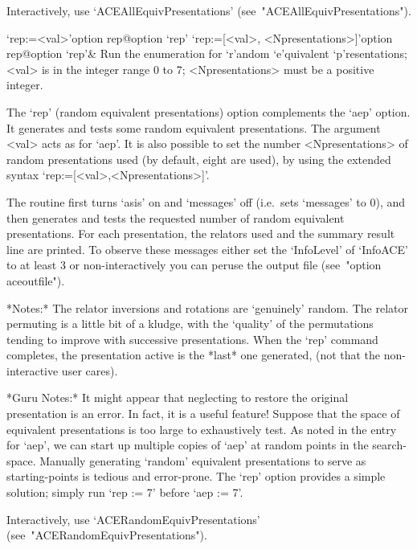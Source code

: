 Interactively,             use              `ACEAllEquivPresentations'
(see~"ACEAllEquivPresentations").

\>`rep:=<val>'{option rep}@{option `rep'}
\>`rep:=[<val>, <Npresentations>]'{option rep}@{option `rep'}&
Run the enumeration for `r'andom `e'quivalent `p'resentations;
<val> is in the integer range 0 to 7;
<Npresentations> must be a positive integer.

The `rep' (random equivalent  presentations)  option  complements  the
`aep'  option.  It  generates  and  tests   some   random   equivalent
presentations. The argument <val>  acts  as  for  `aep'.  It  is  also
possible to set the number <Npresentations>  of  random  presentations
used (by default, eight  are  used),  by  using  the  extended  syntax
`rep:=[<val>,<Npresentations>]'.

The routine first  turns  `asis'  on  and  `messages'  off  (i.e.~sets
`messages' to 0), and then generates and tests the requested number of
random equivalent presentations. For each presentation,  the  relators
used and the  summary  result  line  are  printed.  To  observe  these
messages either set the `InfoLevel' of `InfoACE'  to  at  least  3  or
non-interactively you can peruse the {\ACE} output  file  (see~"option
aceoutfile").

*Notes:*
The relator inversions and rotations are \lq{}genuinely'  random.  The
relator permuting is a little bit of a kludge, with the  \lq{}quality'
of the permutations tending to improve with successive  presentations.
When the `rep' command  completes,  the  presentation  active  is  the
*last* one generated, (not that the non-interactive user cares).

*Guru Notes:*
It might appear that neglecting to restore the  original  presentation
is an error. In fact, it is a useful feature! Suppose that  the  space
of equivalent presentations is too  large  to  exhaustively  test.  As
noted in the entry for `aep', we can start up multiple copies of `aep'
at random points in the  search-space.  Manually  generating  `random'
equivalent presentations to serve as starting-points  is  tedious  and
error-prone. The `rep' option provides a simple solution;  simply  run
`rep := 7' before `aep := 7'.

Interactively,            use            `ACERandomEquivPresentations'
(see~"ACERandomEquivPresentations").

\enditems


